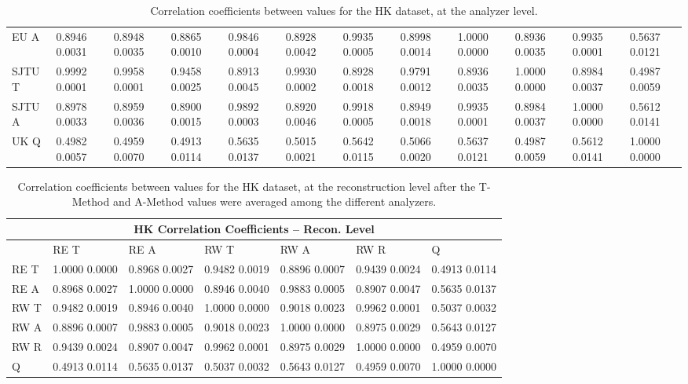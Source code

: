 \begin{landscape}
\begin{table}
\begin{tabularx}{1\linewidth}{@{\extracolsep{\fill}}lXXXXXXXXXXX}
	EU A   & 0.8946 0.0031 & 0.8948 0.0035 & 0.8865 0.0010 & 0.9846 0.0004 & 0.8928 0.0042 & 0.9935 0.0005 & 0.8998 0.0014 & 1.0000 0.0000 & 0.8936 0.0035 & 0.9935 0.0001 & 0.5637 0.0121  \\
	SJTU T & 0.9992 0.0001 & 0.9958 0.0001 & 0.9458 0.0025 & 0.8913 0.0045 & 0.9930 0.0002 & 0.8928 0.0018 & 0.9791 0.0012 & 0.8936 0.0035 & 1.0000 0.0000 & 0.8984 0.0037 & 0.4987 0.0059  \\
	SJTU A & 0.8978 0.0033 & 0.8959 0.0036 & 0.8900 0.0015 & 0.9892 0.0003 & 0.8920 0.0046 & 0.9918 0.0005 & 0.8949 0.0018 & 0.9935 0.0001 & 0.8984 0.0037 & 1.0000 0.0000 & 0.5612 0.0141  \\
	UK Q   & 0.4982 0.0057 & 0.4959 0.0070 & 0.4913 0.0114 & 0.5635 0.0137 & 0.5015 0.0021 & 0.5642 0.0115 & 0.5066 0.0020 & 0.5637 0.0121 & 0.4987 0.0059 & 0.5612 0.0141 & 1.0000 0.0000  \\
  \bottomrule
\end{tabularx}
\caption[]{Correlation coefficients between \R values for the HK dataset, at the analyzer level.}
\label{tab:Corrs_HK_analyzer}
\end{table}
\end{landscape}


\begin{table}
\setlength\tabcolsep{15pt}
\small
\centering
\renewcommand{\arraystretch}{1.4}
\begin{tabularx}{0.8\linewidth}{@{\extracolsep{\fill}}lXXXXXX}
  \toprule
  	\multicolumn{7}{c}{{\normalsize HK Correlation Coefficients -- Recon. Level}} \\
  \midrule
  	       & RE T & RE A & RW T & RW A & RW R & \quad Q \\
  \midrule
	RE T   & 1.0000 0.0000 & 0.8968 0.0027 & 0.9482 0.0019 & 0.8896 0.0007 & 0.9439 0.0024 & 0.4913 0.0114  \\
	RE A   & 0.8968 0.0027 & 1.0000 0.0000 & 0.8946 0.0040 & 0.9883 0.0005 & 0.8907 0.0047 & 0.5635 0.0137  \\
	RW T   & 0.9482 0.0019 & 0.8946 0.0040 & 1.0000 0.0000 & 0.9018 0.0023 & 0.9962 0.0001 & 0.5037 0.0032  \\
	RW A   & 0.8896 0.0007 & 0.9883 0.0005 & 0.9018 0.0023 & 1.0000 0.0000 & 0.8975 0.0029 & 0.5643 0.0127  \\
	RW R   & 0.9439 0.0024 & 0.8907 0.0047 & 0.9962 0.0001 & 0.8975 0.0029 & 1.0000 0.0000 & 0.4959 0.0070  \\
	Q      & 0.4913 0.0114 & 0.5635 0.0137 & 0.5037 0.0032 & 0.5643 0.0127 & 0.4959 0.0070 & 1.0000 0.0000  \\
  \bottomrule
\end{tabularx}
\caption[]{Correlation coefficients between \R values for the HK dataset, at the reconstruction level after the \RW T-Method and A-Method \R values were averaged among the different analyzers.}
\label{tab:Corrs_HK_recon}
\end{table}


